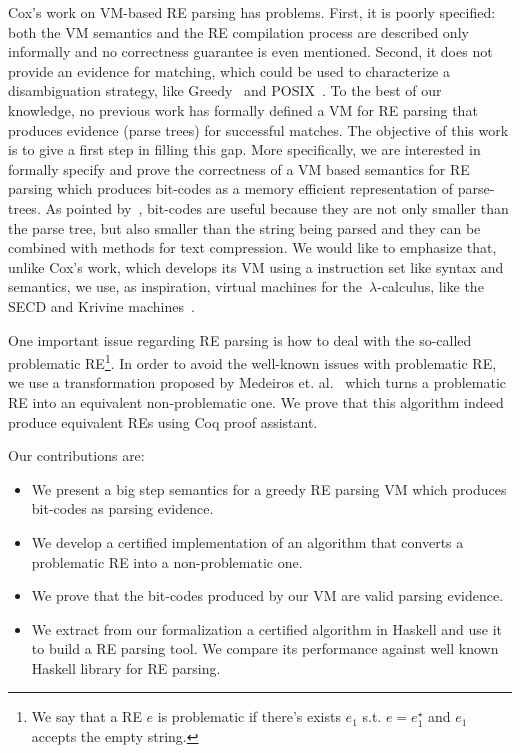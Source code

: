 \documentclass[review]{elsarticle}
\theoremstyle{definition}
\begin{document}
Cox's work on VM-based RE parsing has problems. First, it is poorly specified: both the VM semantics 
and the RE compilation process are described only informally and no correctness guarantee is even mentioned. 
Second, it does not provide an evidence for matching, which could be used to characterize a disambiguation 
strategy, like Greedy~\cite{Frisch2004} and POSIX~\cite{Sulzmann14}. To the best of our knowledge, no 
previous work has formally defined a VM for RE parsing that produces evidence (parse trees) for successful matches.
The objective of this work is to give a first step in filling this gap. More specifically, we are interested in formally
specify and prove the correctness of a VM based semantics for RE parsing which produces bit-codes as
a memory efficient representation of parse-trees. As pointed by~\cite{Lasse2011}, bit-codes are useful because they
are not only smaller than the parse tree, but also smaller than the string being parsed and they can be combined with methods
for text compression. We would like to emphasize that, unlike Cox's work, which develops its VM using a instruction 
set like syntax and semantics, we use, as inspiration, virtual machines for the~$\lambda$-calculus, like the 
SECD and Krivine machines~\cite{Krivine07,Landin64}. 

One important issue regarding RE parsing is how to deal with the so-called problematic 
RE\footnote{We say that a RE $e$ is problematic if there's exists $e_1$ s.t. $e = e_1^\star$ and 
$e_1$ accepts the empty string.}\cite{Frisch2004}. In order to avoid the well-known issues with 
problematic RE, we use a transformation proposed by Medeiros et. al.~\cite{Medeiros14} which turns a
problematic RE into an equivalent non-problematic one. We prove that this algorithm indeed produce
equivalent REs using Coq proof assistant.

Our contributions are:

\begin{itemize}
  \item We present a big step semantics for a greedy RE parsing VM which produces bit-codes as parsing evidence.
  \item We develop a certified implementation of an algorithm that converts a problematic RE into a 
  non-problematic one.
  \item We prove that the bit-codes produced by our VM are valid parsing evidence.
  \item We extract from our formalization a certified algorithm in Haskell and use it 
  to build a RE parsing tool. We compare its performance against 
  well known Haskell library for RE parsing.  
\end{itemize}
\end{document}
